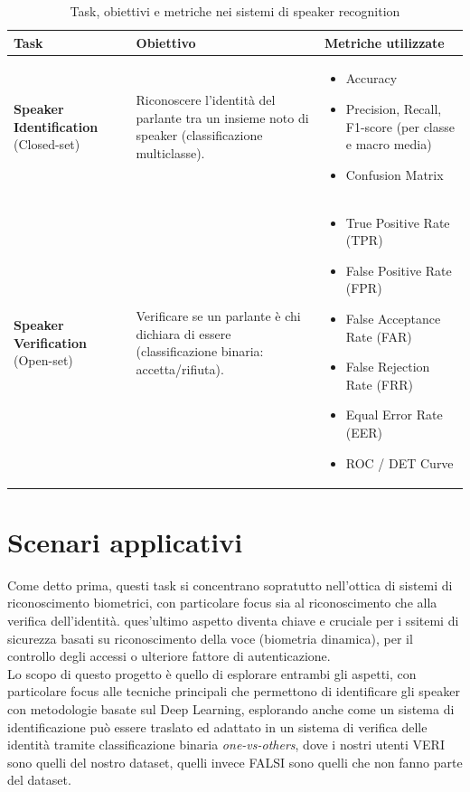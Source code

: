 \begin{table}[ht]
    \centering
    \renewcommand{\arraystretch}{1.4}
    \begin{tabular}{@{} m{4cm} m{5.5cm} m{6.5cm} @{}}
    \toprule
    \textbf{Task} & \textbf{Obiettivo} & \textbf{Metriche utilizzate} \\
    \midrule
    \textbf{Speaker Identification} (Closed-set) & 
    Riconoscere l'identità del parlante tra un insieme noto di speaker (classificazione multiclasse). & 
    \begin{itemize}
    \item Accuracy
    \item Precision, Recall, F1-score (per classe e macro media)
    \item Confusion Matrix
    \end{itemize} \\
    \midrule
    \textbf{Speaker Verification} (Open-set) & 
    Verificare se un parlante è chi dichiara di essere (classificazione binaria: accetta/rifiuta). & 
    \begin{itemize}
    \item True Positive Rate (TPR)
    \item False Positive Rate (FPR)
    \item False Acceptance Rate (FAR)
    \item False Rejection Rate (FRR)
    \item Equal Error Rate (EER)
    \item ROC / DET Curve
    \end{itemize} \\

    \bottomrule
    \end{tabular}
    \caption{Task, obiettivi e metriche nei sistemi di speaker recognition}
    \label{tab:metriche}
\end{table}

\section{Scenari applicativi}
Come detto prima, questi task si concentrano sopratutto nell'ottica di sistemi di riconoscimento biometrici, con particolare
focus sia al riconoscimento che alla verifica dell'identità. ques'ultimo aspetto diventa chiave e cruciale per i ssitemi di sicurezza 
basati su riconoscimento della voce (biometria dinamica), per il controllo degli accessi o ulteriore fattore di autenticazione. \\
Lo scopo di questo progetto è quello di esplorare entrambi gli aspetti, con particolare focus alle tecniche principali che permettono di identificare
gli speaker con metodologie basate sul Deep Learning, esplorando anche come un sistema di identificazione può essere traslato ed adattato
in un sistema di verifica delle identità tramite classificazione binaria \textit{one-vs-others}, dove i nostri utenti VERI sono quelli del nostro dataset,
quelli invece FALSI sono quelli che non fanno parte del dataset. 